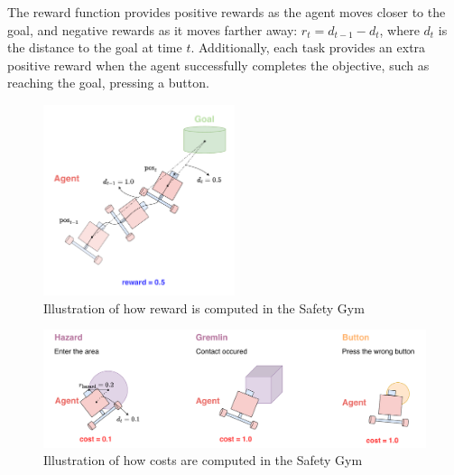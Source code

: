 The reward function provides positive rewards as the agent moves closer to the goal, and negative rewards as it moves farther away:
$ r_t = d_{t - 1} - d_t $, where $d_t$ is the distance to the goal at time $t$.
Additionally, each task provides an extra positive reward when the agent successfully completes the objective, such as reaching the goal, pressing a button. %
\begin{figure}[h]
  \centering
  \includegraphics[width=0.5\textwidth]{imgs/chap4/setup/reward.pdf}
  \caption{Illustration of how reward is computed in the Safety Gym}
  \label{chap4:fig:reward}
\end{figure}

\begin{figure}[h]
  \centering
  \includegraphics[width=1.0\textwidth]{imgs/chap4/setup/cost.pdf}
  \caption{Illustration of how costs are computed in the Safety Gym}
  \label{chap4:fig:cost}
\end{figure}

